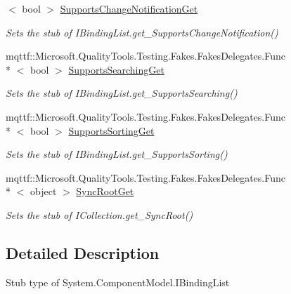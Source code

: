 \begin{DoxyCompactItemize}
$<$ bool $>$ \hyperlink{class_system_1_1_component_model_1_1_fakes_1_1_stub_i_binding_list_ae766903000b1313f0095c765a973b397}{Supports\-Change\-Notification\-Get}
\begin{DoxyCompactList}\small\item\em Sets the stub of I\-Binding\-List.\-get\-\_\-\-Supports\-Change\-Notification()\end{DoxyCompactList}\item 
mqttf\-::\-Microsoft.\-Quality\-Tools.\-Testing.\-Fakes.\-Fakes\-Delegates.\-Func\\*
$<$ bool $>$ \hyperlink{class_system_1_1_component_model_1_1_fakes_1_1_stub_i_binding_list_a7586f0b3d0165f5e1bb3b0c3ca1359d1}{Supports\-Searching\-Get}
\begin{DoxyCompactList}\small\item\em Sets the stub of I\-Binding\-List.\-get\-\_\-\-Supports\-Searching()\end{DoxyCompactList}\item 
mqttf\-::\-Microsoft.\-Quality\-Tools.\-Testing.\-Fakes.\-Fakes\-Delegates.\-Func\\*
$<$ bool $>$ \hyperlink{class_system_1_1_component_model_1_1_fakes_1_1_stub_i_binding_list_ad3b1badf2a116d217a4bb0e8a1225335}{Supports\-Sorting\-Get}
\begin{DoxyCompactList}\small\item\em Sets the stub of I\-Binding\-List.\-get\-\_\-\-Supports\-Sorting()\end{DoxyCompactList}\item 
mqttf\-::\-Microsoft.\-Quality\-Tools.\-Testing.\-Fakes.\-Fakes\-Delegates.\-Func\\*
$<$ object $>$ \hyperlink{class_system_1_1_component_model_1_1_fakes_1_1_stub_i_binding_list_a650ffb1d812f129f4840071d4fff72b5}{Sync\-Root\-Get}
\begin{DoxyCompactList}\small\item\em Sets the stub of I\-Collection.\-get\-\_\-\-Sync\-Root()\end{DoxyCompactList}\end{DoxyCompactItemize}


\subsection{Detailed Description}
Stub type of System.\-Component\-Model.\-I\-Binding\-List



